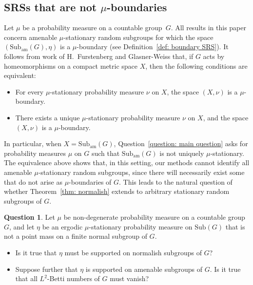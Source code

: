 \documentclass[reqno,a4paper,11pt]{amsart}
\numberwithin{equation}{section}
\newcommand{\1}{\mathbf{1}}
\newcommand{\sub}[1]{\mathrm{Sub}(#1)}
\newcommand{\subam}[1]{\mathrm{Sub}_{\mathrm{am}}(#1)}
\theoremstyle{definition}
\newtheorem{qnnum}{Question}
\begin{document}
\subsection{SRSs that are not $\mu$-boundaries}
Let $\mu$ be a probability measure on a countable group~$G$. All results in this paper concern amenable $\mu$-stationary random subgroups for which the space $(\subam{G},\eta)$ is a $\mu$-boundary (see Definition~\ref{def: boundary SRS}).  It follows from work of H.~Furstenberg \cite[Theorem 14.1]{Furstenberg1972} and Glasner-Weiss \cite[Theorem 8.5]{GlasnerWeiss2016} that, if $G$ acts by homeomorphisms on a compact metric space $X$, then the following conditions are equivalent:
\begin{itemize}
	\item For every $\mu$-stationary probability measure $\nu$ on $X$, the space $(X,\nu)$ is a $\mu$-boundary.
	\item There exists a unique $\mu$-stationary probability measure $\nu$ on $X$, and the space $(X,\nu)$ is a $\mu$-boundary.
\end{itemize}

In particular, when $X=\subam{G}$, Question~\ref{question: main question} asks for probability measures $\mu$ on $G$ such that $\subam{G}$ is not uniquely $\mu$-stationary. The equivalence above shows that, in this setting, our methods cannot identify all amenable $\mu$-stationary random subgroups, since there will necessarily exist some that do not arise as $\mu$-boundaries of $G$. This leads to the natural question of whether Theorem~\ref{thm: normalish} extends to arbitrary stationary random subgroups of $G$.

\begin{qnnum}
	Let $\mu$ be non-degenerate probability measure on a countable group $G$, and let $\eta$ be an ergodic $\mu$-stationary probability measure on $\sub{G}$ that is not a point mass on a finite normal subgroup of $G$. 
	\begin{itemize}
		\item Is it true that $\eta$ must be supported on normalish subgroups of $G$?
		\item Suppose further that $\eta$ is supported on amenable subgroups of $G$. Is it true that all $L^2$-Betti numbers of $G$ must vanish?
	\end{itemize}
\end{qnnum}
\end{document}
